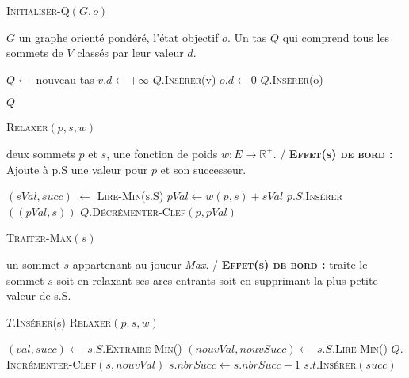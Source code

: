 

\begin{algorithm}
	\caption{\textsc {Initialiser-Q}$(G,o)$}
	 \label{algo:initQ}
	\begin{algorithmic}[1]
		\REQUIRE $G$ un graphe orienté pondéré, l'état objectif $o$.
		\ENSURE Un tas $Q$ qui comprend tous les sommets de $V$ classés par leur valeur $d$.
		
		\STATE $Q \leftarrow$ nouveau tas 
			\STATE $v.d \leftarrow +\infty$
			\STATE $Q.$\textsc{Insérer}(v)
		\ENDFOR
			\STATE $o.d \leftarrow 0$
			\STATE $Q.$\textsc{Insérer}(o)	
		\ENDFOR
		
		\RETURN $Q$
	
			
\end{algorithmic}
		
\end{algorithm}


\begin{algorithm}
	\caption{\textsc {Relaxer}$(p,s,w)$}
	 \label{algo:relaxerMinMax}
	\begin{algorithmic}[1]
		\REQUIRE deux sommets $p$ et $s$, une fonction de poids $w : E \rightarrow \mathbb{R}^{+}$.
		\ENSURE / \textbf{\textsc{Effet(s) de bord :}} Ajoute à p.S une valeur pour $p$ et son successeur.
		
		\STATE $(sVal,succ)$ $\leftarrow$ \textsc{Lire-Min(s.S)}
		\STATE $pVal \leftarrow w(p,s) + sVal$
		\STATE $p.S.$\textsc{Insérer}$((pVal,s))$
		\STATE $Q.$\textsc{Décrémenter-Clef}$(p,pVal)$
			
\end{algorithmic}
		
\end{algorithm}


\begin{algorithm}
	\caption{\textsc {Traiter-Max}$(s)$}
	 \label{algo:traiterMax}
	\begin{algorithmic}[1]
		\REQUIRE un sommet $s$ appartenant au joueur \textit{Max}.
		\ENSURE / \textbf{\textsc{Effet(s) de bord :}} traite le sommet $s$ soit en relaxant ses arcs entrants soit en supprimant la plus petite valeur de s.S.
		
			\STATE $T.$\textsc{Insérer}(s)
				\STATE \textsc{Relaxer}$(p,s,w)$
			\ENDFOR
			
		\ELSE
			\STATE $(val,succ) \leftarrow$ $s.S.$\textsc{Extraire-Min}()
			\STATE $(nouvVal,nouvSucc) \leftarrow$ $s.S.$\textsc{Lire-Min}()
			\STATE $Q.$\textsc{Incrémenter-Clef}$(s,nouvVal)$
			\STATE $s.nbrSucc \leftarrow s.nbrSucc - 1 $
			\STATE $s.t.$\textsc{Insérer}$(succ)$
		\ENDIF
			
				
			
\end{algorithmic}
		
\end{algorithm}


